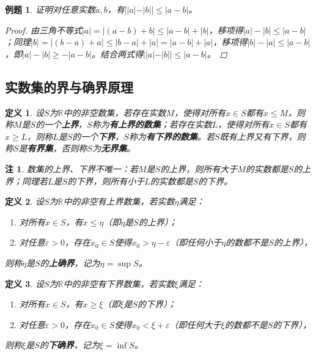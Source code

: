 \documentclass[11pt, a4paper, openany]{article}
\newtheorem{definition}{定义}[section]
\newtheorem{example}{例题}[section]
\newtheorem{remark}{注}[section]
\begin{document}
\begin{example}
证明对任意实数$a,b$，有$||a|-|b||\leq|a-b|$。
\begin{proof}
由三角不等式$|a|=|(a-b)+b|\leq|a-b|+|b|$，移项得$|a|-|b|\leq|a-b|$；同理$|b|=|(b-a)+a|\leq|b-a|+|a|=|a-b|+|a|$，移项得$|b|-|a|\leq|a-b|$，即$|a|-|b|\geq-|a-b|$。结合两式得$||a|-|b||\leq|a-b|$。
\end{proof}
\end{example}

\subsection{实数集的界与确界原理}
\begin{definition}
设$S$为$\mathbb{R}$中的非空数集，若存在实数$M$，使得对所有$x\in S$都有$x\leq M$，则称$M$是$S$的一个\textbf{上界}，$S$称为\textbf{有上界的数集}；若存在实数$L$，使得对所有$x\in S$都有$x\geq L$，则称$L$是$S$的一个\textbf{下界}，$S$称为\textbf{有下界的数集}。若$S$既有上界又有下界，则称$S$是\textbf{有界集}，否则称$S$为\textbf{无界集}。
\end{definition}

\begin{remark}
数集的上界、下界不唯一：若$M$是$S$的上界，则所有大于$M$的实数都是$S$的上界；同理若$L$是$S$的下界，则所有小于$L$的实数都是$S$的下界。
\end{remark}

\begin{definition}
设$S$为$\mathbb{R}$中的非空有上界数集，若实数$\eta$满足：
\begin{enumerate}
    \item 对所有$x\in S$，有$x\leq\eta$（即$\eta$是$S$的上界）；
    \item 对任意$\varepsilon>0$，存在$x_0\in S$使得$x_0>\eta-\varepsilon$（即任何小于$\eta$的数都不是$S$的上界），
\end{enumerate}
则称$\eta$是$S$的\textbf{上确界}，记为$\eta=\sup S$。
\end{definition}

\begin{definition}
设$S$为$\mathbb{R}$中的非空有下界数集，若实数$\xi$满足：
\begin{enumerate}
    \item 对所有$x\in S$，有$x\geq\xi$（即$\xi$是$S$的下界）；
    \item 对任意$\varepsilon>0$，存在$x_0\in S$使得$x_0<\xi+\varepsilon$（即任何大于$\xi$的数都不是$S$的下界），
\end{enumerate}
则称$\xi$是$S$的\textbf{下确界}，记为$\xi=\inf S$。
\end{definition}
\end{document}
